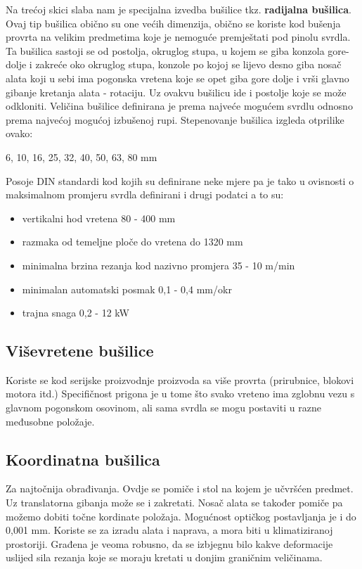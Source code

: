 \documentclass[a4paper,12pt]{article}
\numberwithin{figure}{section}
\begin{document}
Na trećoj skici slaba nam je specijalna izvedba bušilice tkz. \textbf{radijalna bušilica}. Ovaj tip bušilica obično su one većih dimenzija, obično se koriste kod bušenja provrta na velikim predmetima koje je nemoguće premještati pod pinolu svrdla. Ta bušilica sastoji se od postolja, okruglog stupa, u kojem se giba konzola gore-dolje i zakreće oko okruglog stupa, konzole po kojoj se lijevo desno giba nosač alata koji u sebi ima pogonska vretena koje se opet giba gore dolje i vrši glavno gibanje kretanja alata - rotaciju. Uz ovakvu bušilicu ide i postolje koje se može odkloniti. Veličina bušilice definirana je prema najveće mogućem svrdlu odnosno prema najvećoj mogućoj izbušenoj rupi. Stepenovanje bušilica izgleda otprilike ovako:
\begin{center}
6, 10, 16, 25, 32, 40, 50, 63, 80 mm
\end{center}
Posoje DIN standardi kod kojih su definirane neke mjere pa je tako u ovisnosti o maksimalnom promjeru svrdla definirani i drugi podatci a to su:
\begin{itemize}
\item vertikalni hod vretena 80 - 400 mm
\item razmaka od temeljne ploče do vretena do 1320 mm
\item minimalna brzina rezanja kod nazivno promjera  35 - 10 m/min
\item minimalan automatski posmak 0,1 - 0,4 mm/okr
\item trajna snaga 0,2 - 12 kW
\end{itemize}
\subsection{Viševretene bušilice}
Koriste se kod serijske proizvodnje proizvoda sa više provrta (prirubnice, blokovi motora itd.) Specifičnost prigona je u tome što svako vreteno ima zglobnu vezu s glavnom pogonskom osovinom, ali sama svrdla se mogu postaviti u razne međusobne položaje.
\subsection{Koordinatna bušilica}
Za najtočnija obrađivanja. Ovdje se pomiče i stol na kojem je učvršćen predmet. Uz translatorna gibanja može se i zakretati. Nosač alata se također pomiče pa možemo dobiti točne kordinate položaja. Mogućnost optičkog postavljanja je i do 0,001 mm. Koriste se za izradu alata i naprava, a mora biti u klimatiziranoj prostoriji. Građena je veoma robusno, da se izbjegnu bilo kakve deformacije uslijed sila rezanja koje se moraju kretati u donjim graničnim veličinama.
\end{document}
